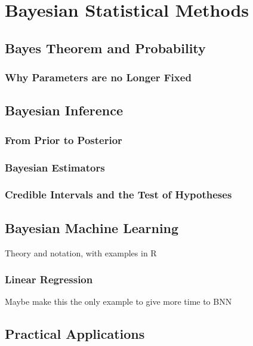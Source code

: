 \chapter{Bayesian Statistical Methods}

\section{Bayes Theorem and Probability} %

\subsection{Why Parameters are no Longer Fixed}

\section{Bayesian Inference} %

\subsection{From Prior to Posterior}

\subsection{Bayesian Estimators}

\subsection{Credible Intervals and the Test of Hypotheses}

\section{Bayesian Machine Learning} %

Theory and notation, with examples in R

\subsection{Linear Regression}
Maybe make this the only example to give more time to BNN


\section{Practical Applications} %